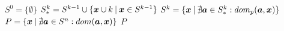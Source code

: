 \begin{algorithmic}[1] %
    \State $S^0 = \big\{\emptyset\big\}$
      \State $S_*^k = S^{k-1} \cup \{\boldsymbol{x} \cup k \:|\: \boldsymbol{x} \in S^{k-1}\}$
      \State $S^k = \{\boldsymbol{x} \:|\: \nexists \boldsymbol{a} \in S_*^k: dom_p(\boldsymbol{a}, \boldsymbol{x}) \}$
    \EndFor
  \State $P = \{\boldsymbol{x} \:|\: \nexists \boldsymbol{a} \in S^n: dom(\boldsymbol{a}, \boldsymbol{x}) \}$
  \State \Return $P$
  \EndFunction
\end{algorithmic}
